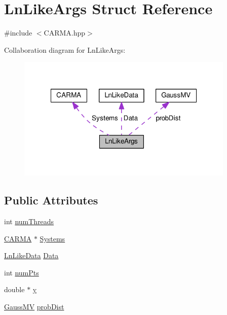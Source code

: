 \hypertarget{struct_ln_like_args}{\section{Ln\-Like\-Args Struct Reference}
\label{struct_ln_like_args}
}


{\ttfamily \#include $<$C\-A\-R\-M\-A.\-hpp$>$}



Collaboration diagram for Ln\-Like\-Args\-:\nopagebreak
\begin{figure}[H]
\begin{center}
\leavevmode
\includegraphics[width=294pt]{struct_ln_like_args__coll__graph}
\end{center}
\end{figure}
\subsection*{Public Attributes}
\begin{DoxyCompactItemize}
\item 
int \hyperlink{struct_ln_like_args_ad84da20749d9935f6a5a04b5c56d729a}{num\-Threads}
\item 
\hyperlink{class_c_a_r_m_a}{C\-A\-R\-M\-A} $\ast$ \hyperlink{struct_ln_like_args_af605bb6dcb409ad41dfc1a00c1e12c3f}{Systems}
\item 
\hyperlink{struct_ln_like_data}{Ln\-Like\-Data} \hyperlink{struct_ln_like_args_aa9a0a2c4945292f8429e4f0738db611b}{Data}
\item 
int \hyperlink{struct_ln_like_args_a14cedd7e2fed9d152ce3de6383567dad}{num\-Pts}
\item 
double $\ast$ \hyperlink{struct_ln_like_args_a49e48f13e6203cf7f629d3485416874f}{y}
\item 
\hyperlink{struct_gauss_m_v}{Gauss\-M\-V} \hyperlink{struct_ln_like_args_ad8d1ee1e21bab664c116720df98cf287}{prob\-Dist}
\end{DoxyCompactItemize}


